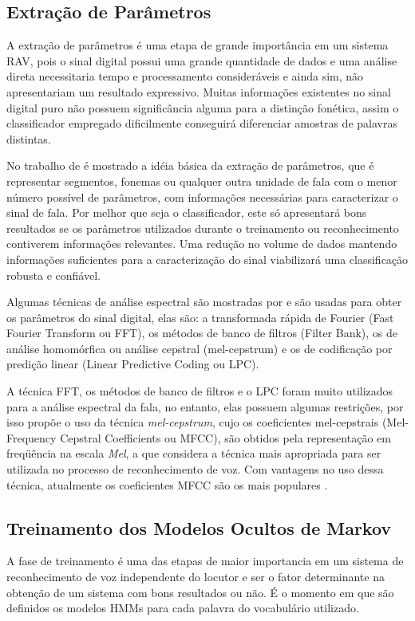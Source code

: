 \subsection{Extração de Parâmetros} 
A extração de parâmetros é uma etapa de grande importância em um sistema RAV, pois o sinal digital possui uma grande quantidade de dados e uma análise direta necessitaria tempo e processamento consideráveis e ainda sim, não apresentariam um resultado expressivo. Muitas informações existentes no sinal digital puro não possuem significância alguma para a distinção fonética, assim o classificador empregado dificilmente conseguirá diferenciar amostras de palavras distintas.

No trabalho de  é mostrado a idéia básica da extração de parâmetros, que é representar segmentos, fonemas ou qualquer outra unidade de fala com o menor número possível de parâmetros, com informações necessárias para caracterizar o sinal de fala. Por melhor que seja o classificador, este só apresentará bons resultados se os parâmetros utilizados durante o treinamento ou reconhecimento contiverem informações relevantes. Uma redução no volume de dados mantendo informações suficientes para a caracterização do sinal viabilizará uma classificação robusta e confiável.

Algumas técnicas de análise espectral são mostradas por  e são usadas para obter os parâmetros do sinal digital, elas são: a transformada rápida de Fourier (Fast Fourier Transform ou FFT), os métodos de banco de filtros (Filter Bank), os de análise homomórfica ou análise cepstral (mel-cepstrum) e os de codificação por
predição linear (Linear Predictive Coding ou LPC).

A técnica FFT, os métodos de banco de filtros e o LPC foram muito utilizados para a análise espectral da fala, no entanto, elas possuem algumas restrições, por isso  propõe o uso da técnica \textit{mel-cepstrum}, cujo os coeficientes mel-cepstrais (Mel-Frequency Cepstral Coefficients ou MFCC), são obtidos pela representação em freqüência na escala \textit{Mel}, a que considera a técnica mais apropriada para ser
utilizada no processo de reconhecimento de voz. Com vantagens no uso dessa técnica, atualmente os coeficientes MFCC
são os mais populares \cite{IsolatWordBouroba}.

\subsection{Treinamento dos Modelos Ocultos de Markov}
A fase de treinamento é uma das etapas de maior importancia em um sistema de reconhecimento de voz independente do locutor e ser o fator determinante na obtenção de um sistema com bons resultados ou não. É o momento em que são definidos os modelos HMMs para cada palavra do vocabulário utilizado.

